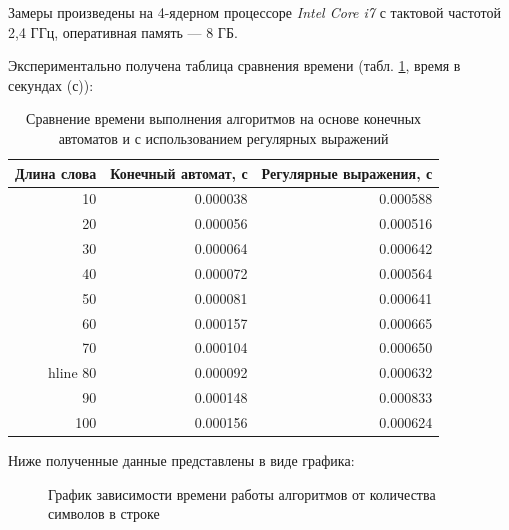 \documentclass[a4paper,12pt]{article}
\begin{document}
Замеры произведены на 4-ядерном процессоре \textit{Intel Core i7}
с тактовой частотой 2,4 ГГц, оперативная память --- 8 ГБ.

Экспериментально получена таблица сравнения времени 
(табл. \ref{time1}, время в секундах (с)):

\begin{table} [h!]
	\begin{center}
		\caption{Сравнение времени выполнения алгоритмов на основе конечных автоматов и с использованием регулярных выражений}
		\begin{tabular}{|r|r|r|}
			\hline
			Длина слова & Конечный автомат, с & Регулярные выражения, с \\
			\hline
			10 &    0.000038 &   0.000588 \\
			\hline
			20 &    0.000056 &   0.000516 \\
			\hline
			30 &    0.000064 &   0.000642 \\
			\hline
			40 &    0.000072 &   0.000564 \\
			\hline
			50 &    0.000081 &   0.000641 \\
			\hline
			60 &    0.000157 &   0.000665 \\
			\hline
			70 &    0.000104 &   0.000650 \\
			hline
			80 &    0.000092 &   0.000632 \\
			\hline
			90 &    0.000148 &   0.000833 \\
			\hline
			100 &  0.000156 &   0.000624 \\
			\hline
		\end{tabular} 
		\label{time1}
	\end{center}
\end{table}

\newpage

Ниже полученные данные представлены в виде графика:

\begin{figure}[h!]
	\centering
{}
\caption{График зависимости времени работы алгоритмов от количества символов в строке}
\end{figure}
\end{document}
